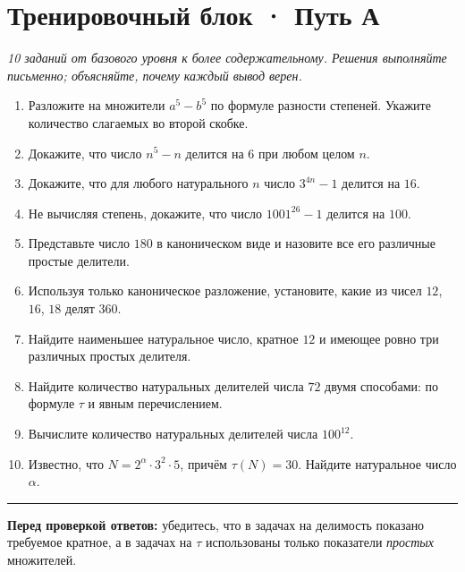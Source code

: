 \documentclass[a4paper,12pt]{article}
\newcommand{\sectiontitle}[1]{\needspace{5\baselineskip}\section*{\color{deepaccent}#1}}
\begin{document}
\sectiontitle{Тренировочный блок · Путь А}
\textit{10 заданий от базового уровня к более содержательному. Решения выполняйте письменно; объясняйте, почему каждый вывод верен.}
\begin{enumerate}[label=\textbf{\arabic*.},leftmargin=10mm,itemsep=12pt]
\item Разложите на множители $a^5-b^5$ по формуле разности степеней. Укажите количество слагаемых во второй скобке.
\item Докажите, что число $n^5-n$ делится на $6$ при любом целом $n$.
\item Докажите, что для любого натурального $n$ число $3^{4n}-1$ делится на $16$.
\item Не вычисляя степень, докажите, что число $1001^{26}-1$ делится на $100$.
\item Представьте число $180$ в каноническом виде и назовите все его различные простые делители.
\item Используя только каноническое разложение, установите, какие из чисел $12$, $16$, $18$ делят $360$.
\item Найдите наименьшее натуральное число, кратное $12$ и имеющее ровно три различных простых делителя.
\item Найдите количество натуральных делителей числа $72$ двумя способами: по формуле $\tau$ и явным перечислением.
\item Вычислите количество натуральных делителей числа $100^{12}$.
\item Известно, что $N=2^{\alpha}\cdot3^2\cdot5$, причём $\tau(N)=30$. Найдите натуральное число $\alpha$.
\end{enumerate}
\vfill
\noindent\textcolor{accent}{\rule{\linewidth}{0.35pt}}
\textbf{Перед проверкой ответов:} убедитесь, что в задачах на делимость показано требуемое кратное, а в задачах на $\tau$ использованы только показатели \emph{простых} множителей.
\clearpage
\end{document}
